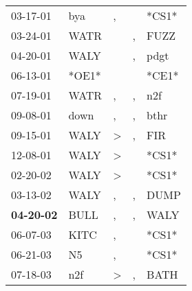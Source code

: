 \begin{supertabular}{p{0.07\textwidth}p{0.06\textwidth}p{0.02\textwidth}p{0.02\textwidth}p{0.06\textwidth}}
          03-17-01\textsuperscript{} &            bya\textsuperscript{} &                , &               &                            *CS1* \\
          03-24-01\textsuperscript{} &           WATR\textsuperscript{} &                  &             , &           FUZZ\textsuperscript{} \\
          04-20-01\textsuperscript{} &           WALY\textsuperscript{} &                  &             , &           pdgt\textsuperscript{} \\
          06-13-01\textsuperscript{} &                            *OE1* &                  &               &                            *CE1* \\
          07-19-01\textsuperscript{} &           WATR\textsuperscript{} &                , &             , &            n2f\textsuperscript{} \\
          09-08-01\textsuperscript{} &           down\textsuperscript{} &                , &             , &           bthr\textsuperscript{} \\
          09-15-01\textsuperscript{} &           WALY\textsuperscript{} &     \textgreater &             , &            FIR\textsuperscript{} \\
          12-08-01\textsuperscript{} &           WALY\textsuperscript{} &     \textgreater &               &                            *CS1* \\
          02-20-02\textsuperscript{} &           WALY\textsuperscript{} &     \textgreater &               &                            *CS1* \\
          03-13-02\textsuperscript{} &           WALY\textsuperscript{} &                , &             , &           DUMP\textsuperscript{} \\
 \textbf{04-20-02\textsuperscript{}} &           BULL\textsuperscript{} &                , &             , &           WALY\textsuperscript{} \\
          06-07-03\textsuperscript{} &           KITC\textsuperscript{} &                , &               &                            *CS1* \\
          06-21-03\textsuperscript{} &             N5\textsuperscript{} &                , &               &                            *CS1* \\
          07-18-03\textsuperscript{} &            n2f\textsuperscript{} &     \textgreater &             , &           BATH\textsuperscript{} \\

\end{supertabular}
